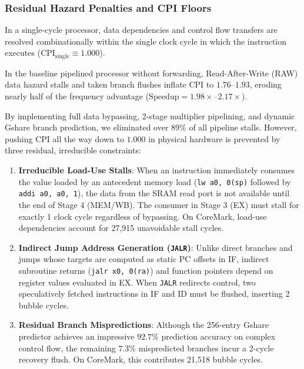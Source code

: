 \subsubsection{Residual Hazard Penalties and CPI Floors}
In a single-cycle processor, data dependencies and control flow transfers are resolved combinationally within the single clock cycle in which the instruction executes ($\text{CPI}_{\text{single}} \equiv 1.000$).

In the baseline pipelined processor without forwarding, Read-After-Write (RAW) data hazard stalls and taken branch flushes inflate CPI to $1.76\text{--}1.93$, eroding nearly half of the frequency advantage ($\text{Speedup} = 1.98\times\text{--}2.17\times$).

By implementing full data bypassing, 2-stage multiplier pipelining, and dynamic Gshare branch prediction, we eliminated over $89\%$ of all pipeline stalls. However, pushing CPI all the way down to $1.000$ in physical hardware is prevented by three residual, irreducible constraints:
\begin{enumerate}
    \item \textbf{Irreducible Load-Use Stalls}: When an instruction immediately consumes the value loaded by an antecedent memory load (\texttt{lw a0, 0(sp)} followed by \texttt{addi a0, a0, 1}), the data from the SRAM read port is not available until the end of Stage 4 (MEM/WB). The consumer in Stage 3 (EX) must stall for exactly 1 clock cycle regardless of bypassing. On CoreMark, load-use dependencies account for 27,915 unavoidable stall cycles.
    \item \textbf{Indirect Jump Address Generation (\texttt{JALR})}: Unlike direct branches and jumps whose targets are computed as static PC offsets in IF, indirect subroutine returns (\texttt{jalr x0, 0(ra)}) and function pointers depend on register values evaluated in EX. When \texttt{JALR} redirects control, two speculatively fetched instructions in IF and ID must be flushed, inserting 2 bubble cycles.
    \item \textbf{Residual Branch Mispredictions}: Although the 256-entry Gshare predictor achieves an impressive $92.7\%$ prediction accuracy on complex control flow, the remaining $7.3\%$ mispredicted branches incur a 2-cycle recovery flush. On CoreMark, this contributes 21,518 bubble cycles.
\end{enumerate}

